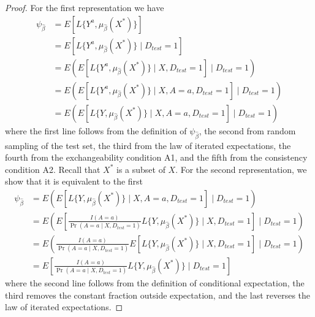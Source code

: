     \begin{proof}
        For the first representation we have 
        \begin{align*}
            \psi_{\widehat{\beta}} &= E[L\{Y^{a}, \mu_{\widehat{\beta}}(X^*)\}] \\
            & = E[L\{Y^{a}, \mu_{\widehat{\beta}}(X^*)\}\mid D_{test} = 1] \\
            & = E(E[L\{Y^{a}, \mu_{\widehat{\beta}}(X^*)\}\mid X, D_{test} = 1] \mid D_{test} = 1) \\
            & = E(E[L\{Y^{a}, \mu_{\widehat{\beta}}(X^*)\}\mid X, A = a, D_{test} = 1] \mid D_{test} = 1) \\
            & = E(E[L\{Y, \mu_{\widehat{\beta}}(X^*)\}\mid X, A = a, D_{test} = 1] \mid D_{test} = 1) 
        \end{align*}
        where the first line follows from the definition of $\psi_{\widehat{\beta}}$, the second from random sampling of the test set, the third from the law of iterated expectations, the fourth from the exchangeability condition A1, and the fifth from the consistency condition A2. Recall that $X^*$ is a subset of $X$. For the second representation, we show that it is equivalent to the first 
        \begin{align*}
            \psi_{\widehat{\beta}} &= E(E[L\{Y, \mu_{\widehat{\beta}}(X^*)\}\mid X,A = a, D_{test} = 1] \mid D_{test} = 1) \\
            &= E\left(E\left[\frac{I(A = a)}{\Pr(A = a \mid X,D_{test} = 1)}L\{Y, \mu_{\widehat{\beta}}(X^*)\} \mid X,D_{test} = 1\right] \mid D_{test} = 1\right)\\
            &= E\left(\frac{I(A = a)}{\Pr(A = a \mid X,D_{test} = 1)}E\left[L\{Y, \mu_{\widehat{\beta}}(X^*)\} \mid X,D_{test} = 1\right] \mid D_{test} = 1\right)\\
            &= E\left[\frac{I(A = a)}{\Pr(A = a \mid X,D_{test} = 1)}L\{Y, \mu_{\widehat{\beta}}(X^*)\} \mid D_{test} = 1\right]
        \end{align*}
        where the second line follows from the definition of conditional expectation, the third removes the constant fraction outside expectation, and the last reverses the law of iterated expectations.
    \end{proof}
    
